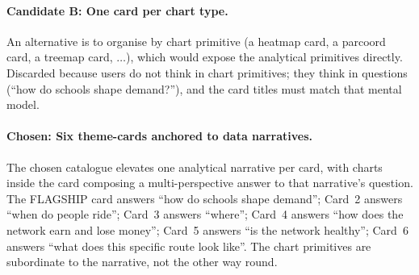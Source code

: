 \paragraph{Candidate B: One card per chart type.}
An alternative is to organise by chart primitive (a heatmap card,
a parcoord card, a treemap card, $\dots$), which would expose the
analytical primitives directly. Discarded because users do not
think in chart primitives; they think in questions
(``how do schools shape demand?''), and the card titles must
match that mental model.

\paragraph{Chosen: Six theme-cards anchored to data narratives.}
The chosen catalogue elevates one analytical narrative per card,
with charts inside the card composing a multi-perspective answer
to that narrative's question. The FLAGSHIP card answers ``how
do schools shape demand''; Card~2 answers ``when do people
ride''; Card~3 answers ``where''; Card~4 answers ``how does the
network earn and lose money''; Card~5 answers ``is the network
healthy''; Card~6 answers ``what does this specific route look
like''. The chart primitives are subordinate to the narrative,
not the other way round.
